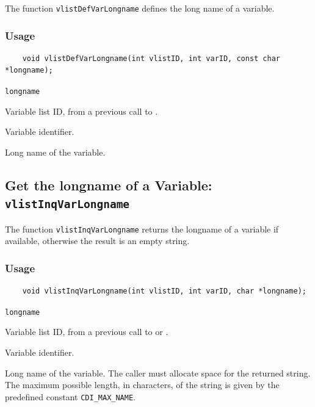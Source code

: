 The function {\texttt{vlistDefVarLongname}} defines the long name of a variable.

\subsubsection*{Usage}

\begin{verbatim}
    void vlistDefVarLongname(int vlistID, int varID, const char *longname);
\end{verbatim}

\hspace*{4mm}\begin{minipage}[]{15cm}
\begin{deflist}{\texttt{longname}\ }
\item[\texttt{vlistID}]
Variable list ID, from a previous call to {}.
\item[\texttt{varID}]
Variable identifier.
\item[\texttt{longname}]
Long name of the variable.

\end{deflist}
\end{minipage}


\subsection{Get the longname of a Variable: \texttt{vlistInqVarLongname}}
\label{vlistInqVarLongname}

The function {\texttt{vlistInqVarLongname}} returns the longname of a variable if available,
otherwise the result is an empty string.

\subsubsection*{Usage}

\begin{verbatim}
    void vlistInqVarLongname(int vlistID, int varID, char *longname);
\end{verbatim}

\hspace*{4mm}\begin{minipage}[]{15cm}
\begin{deflist}{\texttt{longname}\ }
\item[\texttt{vlistID}]
Variable list ID, from a previous call to {} or {}.
\item[\texttt{varID}]
Variable identifier.
\item[\texttt{longname}]
Long name of the variable. The caller must allocate space for the
                    returned string. The maximum possible length, in characters, of
                    the string is given by the predefined constant {\texttt{CDI\_MAX\_NAME}}.

\end{deflist}
\end{minipage}

